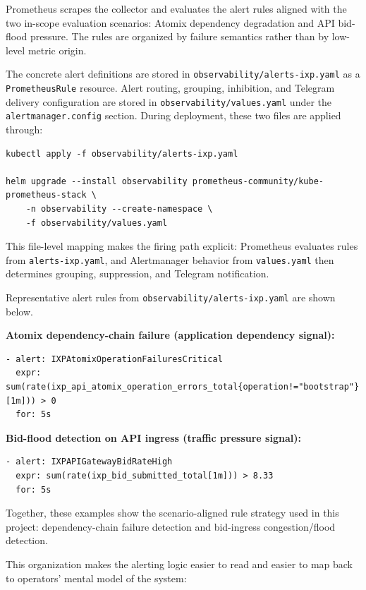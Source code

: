 Prometheus scrapes the collector and evaluates the alert rules aligned with the two in-scope evaluation scenarios: Atomix dependency degradation and API bid-flood pressure. The rules are organized by failure semantics rather than by low-level metric origin.

The concrete alert definitions are stored in \texttt{observability/alerts-ixp.yaml} as a \texttt{PrometheusRule} resource. Alert routing, grouping, inhibition, and Telegram delivery configuration are stored in \texttt{observability/values.yaml} under the \texttt{alertmanager.config} section. During deployment, these two files are applied through:

\begin{verbatim}
kubectl apply -f observability/alerts-ixp.yaml

helm upgrade --install observability prometheus-community/kube-prometheus-stack \
    -n observability --create-namespace \
    -f observability/values.yaml
\end{verbatim}

This file-level mapping makes the firing path explicit: Prometheus evaluates rules from \texttt{alerts-ixp.yaml}, and Alertmanager behavior from \texttt{values.yaml} then determines grouping, suppression, and Telegram notification.

Representative alert rules from \texttt{observability/alerts-ixp.yaml} are shown below.

\textbf{Atomix dependency-chain failure (application dependency signal):}
\begin{verbatim}
- alert: IXPAtomixOperationFailuresCritical
  expr: sum(rate(ixp_api_atomix_operation_errors_total{operation!="bootstrap"}[1m])) > 0
  for: 5s
\end{verbatim}

\textbf{Bid-flood detection on API ingress (traffic pressure signal):}
\begin{verbatim}
- alert: IXPAPIGatewayBidRateHigh
  expr: sum(rate(ixp_bid_submitted_total[1m])) > 8.33
  for: 5s
\end{verbatim}

Together, these examples show the scenario-aligned rule strategy used in this project: dependency-chain failure detection and bid-ingress congestion/flood detection.

This organization makes the alerting logic easier to read and easier to map back to operators' mental model of the system:

